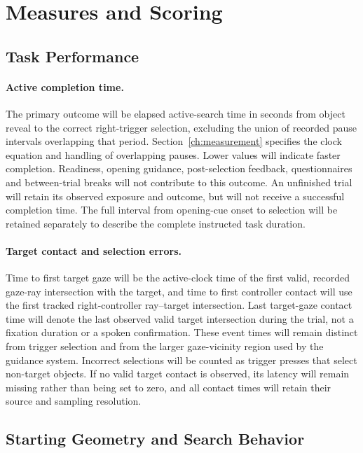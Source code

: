 \section{Measures and Scoring}
\label{sec:scoring}
\subsection{Task Performance}
\paragraph{Active completion time.} The primary outcome will be elapsed active-search time in seconds from object reveal to the correct right-trigger selection, excluding the union of recorded pause intervals overlapping that period. Section~\ref{ch:measurement} specifies the clock equation and handling of overlapping pauses. Lower values will indicate faster completion. Readiness, opening guidance, post-selection feedback, questionnaires and between-trial breaks will not contribute to this outcome. An unfinished trial will retain its observed exposure and outcome, but will not receive a successful completion time. The full interval from opening-cue onset to selection will be retained separately to describe the complete instructed task duration.

\paragraph{Target contact and selection errors.} Time to first target gaze will be the active-clock time of the first valid, recorded gaze-ray intersection with the target, and time to first controller contact will use the first tracked right-controller ray--target intersection. Last target-gaze contact time will denote the last observed valid target intersection during the trial, not a fixation duration or a spoken confirmation. These event times will remain distinct from trigger selection and from the larger gaze-vicinity region used by the guidance system. Incorrect selections will be counted as trigger presses that select non-target objects. If no valid target contact is observed, its latency will remain missing rather than being set to zero, and all contact times will retain their source and sampling resolution.

\subsection{Starting Geometry and Search Behavior}
